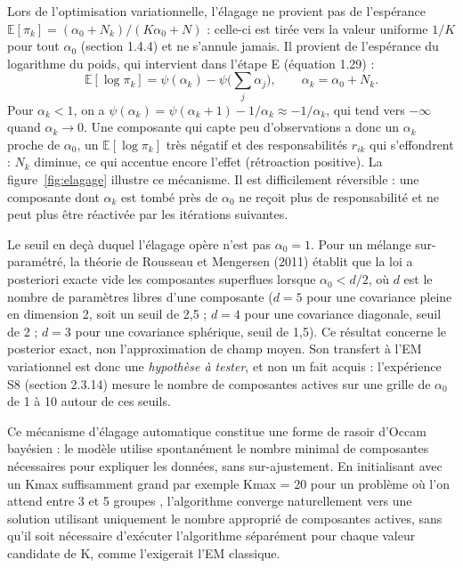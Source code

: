 Lors de l'optimisation variationnelle, l'élagage ne provient pas de l'espérance $\mathbb{E}[\pi_k] = (\alpha_0 + N_k)/(K\alpha_0 + N)$ : celle-ci est tirée vers la valeur uniforme $1/K$ pour tout $\alpha_0$ (section 1.4.4) et ne s'annule jamais. Il provient de l'espérance du logarithme du poids, qui intervient dans l'étape E (équation 1.29) :
\begin{equation*}
\mathbb{E}[\log \pi_k] = \psi(\alpha_k) - \psi\Big(\sum_{j}\alpha_j\Big), \qquad \alpha_k = \alpha_0 + N_k .
\end{equation*}
Pour $\alpha_k < 1$, on a $\psi(\alpha_k) = \psi(\alpha_k + 1) - 1/\alpha_k \approx -1/\alpha_k$, qui tend vers $-\infty$ quand $\alpha_k \to 0$. Une composante qui capte peu d'observations a donc un $\alpha_k$ proche de $\alpha_0$, un $\mathbb{E}[\log \pi_k]$ très négatif et des responsabilités $r_{ik}$ qui s'effondrent : $N_k$ diminue, ce qui accentue encore l'effet (rétroaction positive). La figure~\ref{fig:elagage} illustre ce mécanisme. Il est difficilement réversible : une composante dont $\alpha_k$ est tombé près de $\alpha_0$ ne reçoit plus de responsabilité et ne peut plus être réactivée par les itérations suivantes.



Le seuil en deçà duquel l'élagage opère n'est pas $\alpha_0 = 1$. Pour un mélange sur-paramétré, la théorie de Rousseau et Mengersen (2011) établit que la loi a posteriori exacte vide les composantes superflues lorsque $\alpha_0 < d/2$, où $d$ est le nombre de paramètres libres d'une composante ($d = 5$ pour une covariance pleine en dimension 2, soit un seuil de 2,5 ; $d = 4$ pour une covariance diagonale, seuil de 2 ; $d = 3$ pour une covariance sphérique, seuil de 1,5). Ce résultat concerne le posterior exact, non l'approximation de champ moyen. Son transfert à l'EM variationnel est donc une \emph{hypothèse à tester}, et non un fait acquis : l'expérience S8 (section 2.3.14) mesure le nombre de composantes actives sur une grille de $\alpha_0$ de 1 à 10 autour de ces seuils.

Ce mécanisme d'élagage automatique constitue une forme de rasoir d'Occam bayésien : le modèle utilise spontanément le nombre minimal de composantes nécessaires pour expliquer les données, sans sur-ajustement. En initialisant avec un Kmax suffisamment grand  par exemple Kmax = 20 pour un problème où l'on attend entre 3 et 5 groupes , l'algorithme converge naturellement vers une solution utilisant uniquement le nombre approprié de composantes actives, sans qu'il soit nécessaire d'exécuter l'algorithme séparément pour chaque valeur candidate de K, comme l'exigerait l'EM classique.

